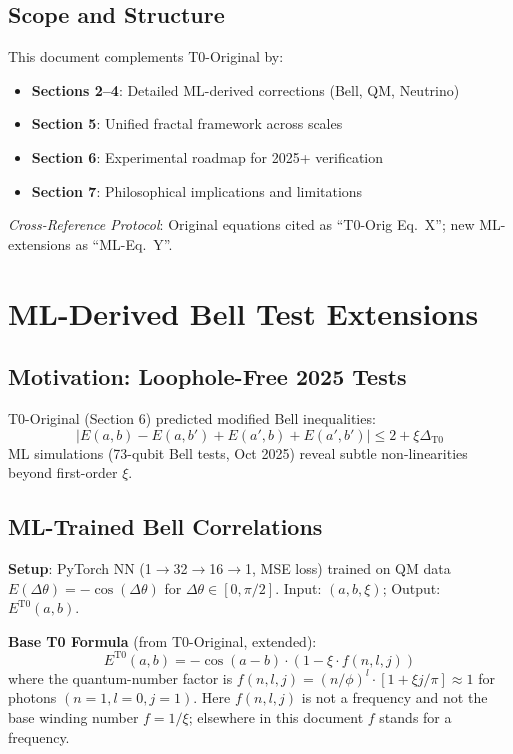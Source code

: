 	\subsection{Scope and Structure}
	
	This document complements T0-Original by:
	\begin{itemize}
		\item \textbf{Sections 2--4}: Detailed ML-derived corrections (Bell, QM, Neutrino)
		\item \textbf{Section 5}: Unified fractal framework across scales
		\item \textbf{Section 6}: Experimental roadmap for 2025+ verification
		\item \textbf{Section 7}: Philosophical implications and limitations
	\end{itemize}
	
	\textit{Cross-Reference Protocol}: Original equations cited as ``T0-Orig Eq.~X''; new ML-extensions as ``ML-Eq.~Y''.
	
	\section{ML-Derived Bell Test Extensions}
	
	\subsection{Motivation: Loophole-Free 2025 Tests}
	
	T0-Original (Section 6) predicted modified Bell inequalities:
	\begin{equation}
		|E(a,b) - E(a,b') + E(a',b) + E(a',b')| \leq 2 + \xi \Delta_{\text{T0}} \tag{T0-Orig Eq.~6.1}
	\end{equation}
	ML simulations (73-qubit Bell tests, Oct 2025) reveal subtle non-linearities beyond first-order $\xi$.
	
	\subsection{ML-Trained Bell Correlations}
	
	\textbf{Setup}: PyTorch NN (1$\to$32$\to$16$\to$1, MSE loss) trained on QM data $E(\Delta\theta) = -\cos(\Delta\theta)$ for $\Delta\theta \in [0,\pi/2]$. Input: $(a, b, \xi)$; Output: $E^{\text{T0}}(a,b)$.
	
	\textbf{Base T0 Formula} (from T0-Original, extended):
	\begin{equation}
		E^{\text{T0}}(a,b) = -\cos(a-b) \cdot \left(1 - \xi \cdot f(n,l,j)\right) \tag{ML-Eq.~2.1}
	\end{equation}
	where the quantum-number factor is $f(n,l,j) = (n/\phi)^l \cdot [1 + \xi j/\pi] \approx 1$ for photons $(n=1, l=0, j=1)$. Here $f(n,l,j)$ is not a frequency and not the base winding number $f = 1/\xi$; elsewhere in this document $f$ stands for a frequency.


